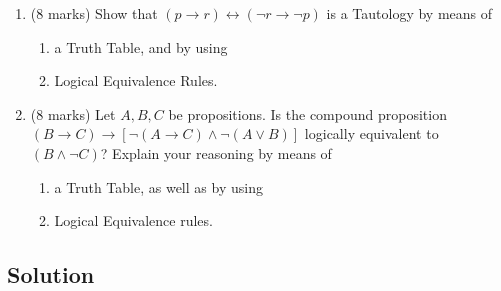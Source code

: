 \documentclass{article}
\begin{document}
\begin{enumerate}[label=\alph*.]
    \item (8 marks) Show that \( (p \to r) \leftrightarrow (\neg r \to \neg p) \) is a Tautology by means of
          \begin{enumerate}[label=\roman*.]
              \item a Truth Table, and by using
              \item Logical Equivalence Rules.
          \end{enumerate}
    \item (8 marks) Let \( A, B, C \) be propositions. Is the compound proposition \( (B \to C) \to [\neg (A \to C) \land \neg (A \lor B)] \) logically equivalent to \( (B \land \neg C) \)? Explain your reasoning by means of
          \begin{enumerate}[label=\roman*.]
              \item a Truth Table, as well as by using
              \item Logical Equivalence rules.
          \end{enumerate}
\end{enumerate}

\subsection*{Solution}
\end{document}
